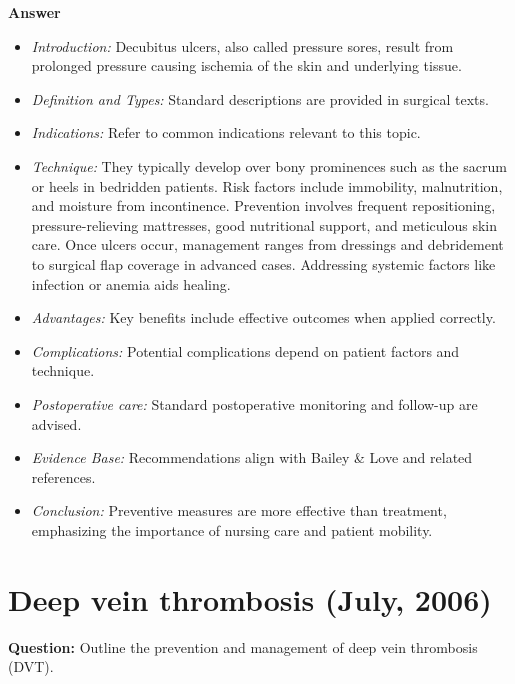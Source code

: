 \documentclass{article}
\begin{document}
\textbf{Answer}
\begin{itemize}

\item \emph{Introduction:} Decubitus ulcers, also called pressure sores, result from prolonged pressure causing ischemia of the skin and underlying tissue.
\item \emph{Definition and Types:} Standard descriptions are provided in surgical texts.
\item \emph{Indications:} Refer to common indications relevant to this topic.

\item \emph{Technique:} They typically develop over bony prominences such as the sacrum or heels in bedridden patients. Risk factors include immobility, malnutrition, and moisture from incontinence. Prevention involves frequent repositioning, pressure-relieving mattresses, good nutritional support, and meticulous skin care. Once ulcers occur, management ranges from dressings and debridement to surgical flap coverage in advanced cases. Addressing systemic factors like infection or anemia aids healing.
\item \emph{Advantages:} Key benefits include effective outcomes when applied correctly.
\item \emph{Complications:} Potential complications depend on patient factors and technique.
\item \emph{Postoperative care:} Standard postoperative monitoring and follow-up are advised.
\item \emph{Evidence Base:} Recommendations align with Bailey \& Love and related references.

\item \emph{Conclusion:} Preventive measures are more effective than treatment, emphasizing the importance of nursing care and patient mobility.


\end{itemize}

\section{Deep vein thrombosis (July, 2006)}

\textbf{Question:} Outline the prevention and management of deep vein thrombosis (DVT).
\end{document}
